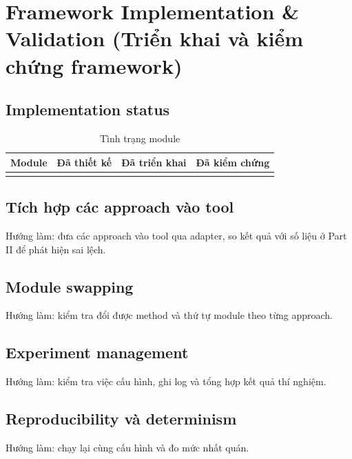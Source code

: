 \chapter{Framework Implementation \& Validation (Triển khai và kiểm chứng framework)}

\section{Implementation status}

\begin{table}[H]
  \centering
  \caption{Tình trạng module}
  \begin{tabularx}{\linewidth}{X l l l}
    \toprule
    \textbf{Module} & \textbf{Đã thiết kế} & \textbf{Đã triển khai} & \textbf{Đã kiểm chứng} \\
    \midrule
     &  &  &  \\
    \bottomrule
  \end{tabularx}
\end{table}

\section{Tích hợp các approach vào tool}

Hướng làm: đưa các approach vào tool qua adapter, so kết quả với số liệu ở Part II để phát hiện sai lệch.

\section{Module swapping}

Hướng làm: kiểm tra đổi được method và thứ tự module theo từng approach.

\section{Experiment management}

Hướng làm: kiểm tra việc cấu hình, ghi log và tổng hợp kết quả thí nghiệm.

\section{Reproducibility và determinism}

Hướng làm: chạy lại cùng cấu hình và đo mức nhất quán.
